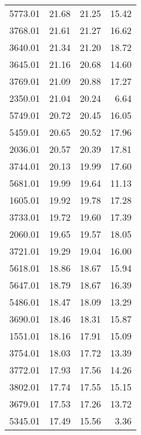 \begin{table}
\begin{tabular}{rrrr}
5773.01 &            21.68 &            21.25 &            15.42 \\
3768.01 &            21.61 &            21.27 &            16.62 \\
3640.01 &            21.34 &            21.20 &            18.72 \\
3645.01 &            21.16 &            20.68 &            14.60 \\
3769.01 &            21.09 &            20.88 &            17.27 \\
2350.01 &            21.04 &            20.24 &             6.64 \\
5749.01 &            20.72 &            20.45 &            16.05 \\
5459.01 &            20.65 &            20.52 &            17.96 \\
2036.01 &            20.57 &            20.39 &            17.81 \\
3744.01 &            20.13 &            19.99 &            17.60 \\
5681.01 &            19.99 &            19.64 &            11.13 \\
1605.01 &            19.92 &            19.78 &            17.28 \\
3733.01 &            19.72 &            19.60 &            17.39 \\
2060.01 &            19.65 &            19.57 &            18.05 \\
3721.01 &            19.29 &            19.04 &            16.00 \\
5618.01 &            18.86 &            18.67 &            15.94 \\
5647.01 &            18.79 &            18.67 &            16.39 \\
5486.01 &            18.47 &            18.09 &            13.29 \\
3690.01 &            18.46 &            18.31 &            15.87 \\
1551.01 &            18.16 &            17.91 &            15.09 \\
3754.01 &            18.03 &            17.72 &            13.39 \\
3772.01 &            17.93 &            17.56 &            14.26 \\
3802.01 &            17.74 &            17.55 &            15.15 \\
3679.01 &            17.53 &            17.26 &            13.72 \\
5345.01 &            17.49 &            15.56 &             3.36 \\

\end{tabular}
\end{table}
